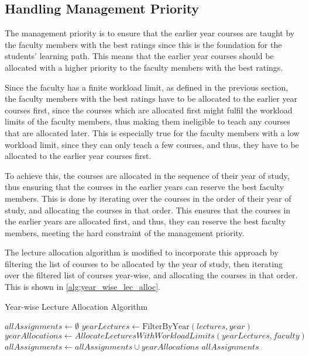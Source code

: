 \subsection{Handling Management Priority}

The management priority is to ensure that the earlier year courses are taught by the faculty members with the best ratings since this is the foundation for the students' learning path. This means that the earlier year courses should be allocated with a higher priority to the faculty members with the best ratings.

Since the faculty has a finite workload limit, as defined in the previous section, the faculty members with the best ratings have to be allocated to the earlier year courses first, since the courses which are allocated first might fulfil the workload limits of the faculty members, thus making them ineligible to teach any courses that are allocated later. This is especially true for the faculty members with a low workload limit, since they can only teach a few courses, and thus, they have to be allocated to the earlier year courses first.

To achieve this, the courses are allocated in the sequence of their year of study, thus ensuring that the courses in the earlier years can reserve the best faculty members. This is done by iterating over the courses in the order of their year of study, and allocating the courses in that order. This ensures that the courses in the earlier years are allocated first, and thus, they can reserve the best faculty members, meeting the hard constraint of the management priority.

The lecture allocation algorithm is modified to incorporate this approach by filtering the list of courses to be allocated by the year of study, then iterating over the filtered list of courses year-wise, and allocating the courses in that order. This is shown in \autoref{alg:year_wise_lec_alloc}.

\begin{algorithm}[H]
  \caption{Year-wise Lecture Allocation Algorithm}
  \begin{algorithmic}[1]
    \State $allAssignments \gets \emptyset$
     
    \State $yearLectures \gets \text{FilterByYear}(lectures, year)$
    \State $yearAllocations \gets AllocateLecturesWithWorkloadLimits(yearLectures, faculty)$
    \State $allAssignments \gets allAssignments \cup yearAllocations$
    \EndFor
    \State \Return $allAssignments$
    \EndProcedure
  \end{algorithmic}
  \label{alg:year_wise_lec_alloc}
\end{algorithm}

